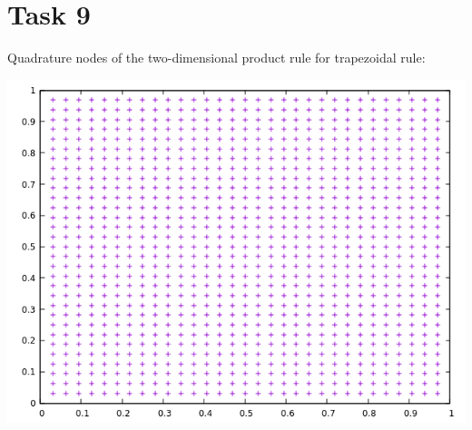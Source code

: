 \documentclass[10pt,a4paper]{article}
\begin{document}
\newpage
\section*{Task 9}

Quadrature nodes of the two-dimensional product rule for trapezoidal rule:
\begin{center}
\includegraphics[scale=0.5]{quadrature_nodes_trapezoidal_rule.png}		
\end{center}
\end{document}
